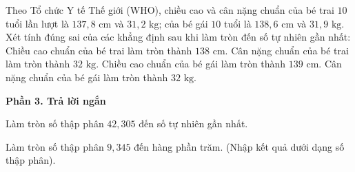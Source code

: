\begin{ex} %
Theo Tổ chức Y tế Thế giới (WHO), chiều cao và cân nặng chuẩn của bé trai $10$ tuổi lần lượt là $137{,}8\text{ cm}$ và $31{,}2\text{ kg}$; của bé gái $10$ tuổi là $138{,}6\text{ cm}$ và $31{,}9\text{ kg}$. Xét tính đúng sai của các khẳng định sau khi làm tròn đến số tự nhiên gần nhất:
\choiceTF
{\True Chiều cao chuẩn của bé trai làm tròn thành $138\text{ cm}$.}
{Cân nặng chuẩn của bé trai làm tròn thành $32\text{ kg}$.}
{\True Chiều cao chuẩn của bé gái làm tròn thành $139\text{ cm}$.}
{\True Cân nặng chuẩn của bé gái làm tròn thành $32\text{ kg}$.}
\end{ex}

\textbf{Phần 3. Trả lời ngắn}

\begin{ex} %
Làm tròn số thập phân $42{,}305$ đến số tự nhiên gần nhất.
\end{ex}

\begin{ex} %
Làm tròn số thập phân $9{,}345$ đến hàng phần trăm. (Nhập kết quả dưới dạng số thập phân).
\end{ex}

